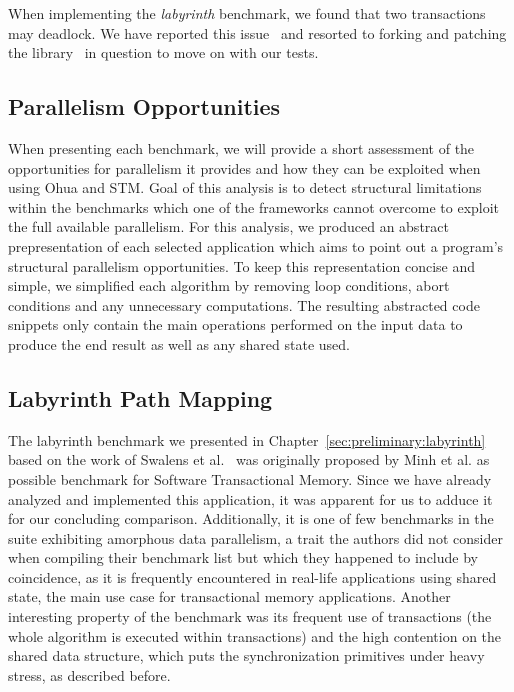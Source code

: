 When implementing the \emph{labyrinth} benchmark, we found that two transactions may deadlock.
We have reported this issue~\cite{wittwer2020stmissue} and resorted to forking and patching the library~\cite{wittwer2020stm} in question to move on with our tests.


\subsection{Parallelism Opportunities}
\label{sec:experiments:opportunities}

When presenting each benchmark, we will provide a short assessment of the opportunities for parallelism it provides and how they can be exploited when using Ohua and STM.
Goal of this analysis is to detect structural limitations within the benchmarks which one of the frameworks cannot overcome to exploit the full available parallelism.
For this analysis, we produced an abstract prepresentation of each selected application which aims to point out a program's structural parallelism opportunities.
To keep this representation concise and simple, we simplified each algorithm by removing loop conditions, abort conditions and any unnecessary computations.
The resulting abstracted code snippets only contain the main operations performed on the input data to produce the end result as well as any shared state used.


\subsection{Labyrinth Path Mapping}
\label{sec:experiments:labyrinth}

The labyrinth benchmark we presented in Chapter~\ref{sec:preliminary:labyrinth} based on the work of Swalens et al.~\cite{swalens2016transactional} was originally proposed by Minh et al. as possible benchmark for Software Transactional Memory.
Since we have already analyzed and implemented this application, it was apparent for us to adduce it for our concluding comparison.
Additionally, it is one of few benchmarks in the suite exhibiting amorphous data parallelism, a trait the authors did not consider when compiling their benchmark list but which they happened to include by coincidence, as it is frequently encountered in real-life applications using shared state, the main use case for transactional memory applications.
Another interesting property of the benchmark was its frequent use of transactions (the whole algorithm is executed within transactions) and the high contention on the shared data structure, which puts the synchronization primitives under heavy stress, as described before.


